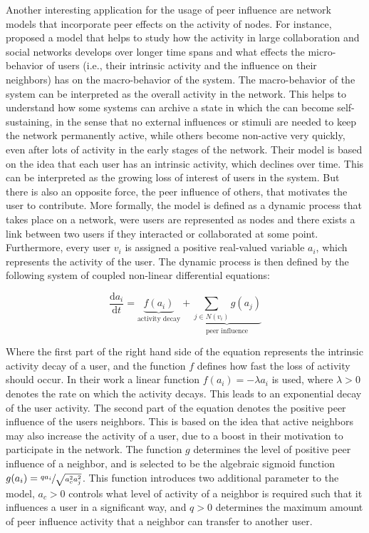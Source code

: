 Another interesting application for the usage of peer influence are network models that incorporate peer effects on the activity of nodes.
For instance, \citet{Walk2016} proposed a model that helps to study how the activity in large collaboration and social networks develops over longer time spans and what effects the micro-behavior of users (i.e., their intrinsic activity and the influence on their neighbors) has on the macro-behavior of the system.
The macro-behavior of the system can be interpreted as the overall activity in the network.
This helps to understand how some systems can archive a state in which the can become self-sustaining, in the sense that no external influences or stimuli are needed to keep the network permanently active, while others become non-active very quickly, even after lots of activity in the early stages of the network.
Their model is based on the idea that each user has an intrinsic activity, which declines over time.
This can be interpreted as the growing loss of interest of users in the system.
But there is also an opposite force, the peer influence of others, that motivates the user to contribute.
More formally, the model is defined as a dynamic process that takes place on a network, were users are represented as nodes and there exists a link between two users if they interacted or collaborated at some point.
Furthermore, every user \( v_{i} \) is assigned a positive real-valued variable \( a_{i} \), which represents the activity of the user.
The dynamic process is then defined by the following system of coupled non-linear differential equations:

\begin{equation}
    \frac{\mathrm{d} a_{i}}{\mathrm{d} t} =  \underbrace{f(a_{i})}_{\text{activity decay}} + \underbrace{\sum_{j \in N(v_{i})} g(a_{j})}_{\text{peer influence}}
\end{equation}

Where the first part of the right hand side of the equation represents the intrinsic activity decay of a user, and the function \( f \) defines how fast the loss of activity should occur.
In their work a linear function \( f(a_{i}) = -\lambda a_{i} \) is used, where \( \lambda > 0 \) denotes the rate on which the activity decays.
This leads to an exponential decay of the user activity.
The second part of the equation denotes the positive peer influence of the users neighbors.
This is based on the idea that active neighbors may also increase the activity of a user, due to a boost in their motivation to participate in the network.
The function \( g \) determines the level of positive peer influence of a neighbor, and is selected to be the algebraic sigmoid function \( g(a_{i}) = \sfrac{q a_{i}}{\sqrt{a_{c}^{2} a_{j}^{2}}} \).
This function introduces two additional parameter to the model, \( a_{c} > 0 \) controls what level of activity of a neighbor is required such that it influences a user in a significant way, and \( q > 0 \) determines the maximum amount of peer influence activity that a neighbor can transfer to another user.

